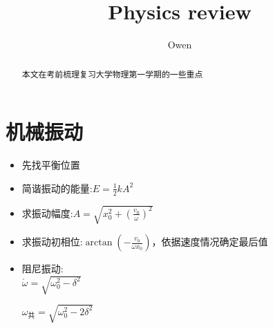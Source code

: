 \documentclass[]{article}
\title{Physics review}
\author{Owen}
\begin{document}
\maketitle
\begin{comment}
	添加的快捷键:
	keysetting\1\id=main/math/frac~0
	keysetting\1\key=Ctrl+Shift+F
	keysetting\2\id=main/math/dfrac~0
	keysetting\2\key=Alt+Shift+F
	keysetting\3\id=main/math/definitions/Corollary~0
	keysetting\3\key=Meta+C
	keysetting\4\id=main/math/definitions/Definition~0
	keysetting\4\key=Meta+D
	keysetting\5\id=main/math/definitions/Example~0
	keysetting\5\key=Meta+E
	keysetting\6\id=main/math/definitions/Lemma~0
	keysetting\6\key=Meta+L
	keysetting\7\id=main/math/definitions/Proof~0
	keysetting\7\key=Meta+P
	keysetting\8\id=main/math/definitions/Proposition~0
	keysetting\8\key=Meta+Shift+P
	keysetting\9\id=main/math/definitions/Remark~0
	keysetting\9\key=Meta+R
	keysetting\10\id=main/math/definitions/Theorem~0
	keysetting\10\key=Meta+T
	keysetting\11\id=main/math/fontstyles/mathcal~0
	keysetting\11\key=Meta+Alt+M
	keysetting\12\id=main/math/fontstyles/mathbb~0
	keysetting\12\key=Meta+Alt+B
	keysetting\13\id=main/math/fontstyles/mathfrak~0
	keysetting\13\key=Meta+Alt+F
	keysetting\14\id=main/math/fontaccent/bar~0
	keysetting\14\key=Meta+Shift+B
	keysetting\15\id=main/math/fontaccent/vec~0
	keysetting\15\key=Meta+Shift+V
	keysetting\16\id=main/math/fontaccent/hat~0
	keysetting\16\key=Meta+Shift+H
	keysetting\size=16
	texstudio参考配置:
	https://blog.csdn.net/XunCiy/article/details/103215124
	https://texstudio-org.github.io/getting_started.html
	一些坑:需要移除环境变量中all-proxy socks://127.0.0.1:9150，不知道是不是tor遗留的，否则github无法提交，新版github已经支持代理了
\end{comment}
\begin{abstract}
本文在考前梳理复习大学物理第一学期的一些重点

\end{abstract}
\newpage
\tableofcontents
\newpage
\section{机械振动}
\begin{itemize}
\item 先找平衡位置
\item 简谐振动的能量:$E=\frac{1}{2}kA^{2}$
\item 求振动幅度:$A=\sqrt{x_{0}^{2}+ (\frac{v_{0}}{\omega})^{2}}$
\item 求振动初相位:$\arctan(-\frac{v_{0}}{\omega x_{0}})，依据速度情况确定最后值$
\item 阻尼振动:\\
$\acute{\omega} = \sqrt{\omega_{0}^{2}-\delta^{2}}$ \par
$\omega_{共}=\sqrt{\omega_{0}^{2}-2\delta^{2}}$\par
\end{itemize}
\end{document}
